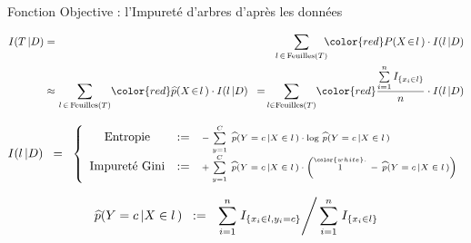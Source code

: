 
\begin{frame}{\vskip -0.5cm \normalsize Fonction Objective : \vskip 0.05cm \Large l'Impuret\'e d'arbres d'apr\`es les donn\'ees}

\vskip -0.5cm

\begin{eqnarray*}
I(T\,\vert D)
& = &
	\!\!\!\!
	\underset{l\,\in\,\textnormal{Feuilles}(T)}{\sum}\!\!
	{\color{red}P(X \!\in\! l\,)} \cdot I(l\,\vert D)
\\
& \approx &
	\!\!\!\!
	\underset{l\,\in\,\textnormal{Feuilles}(T)}{\sum}
	{\color{red}\widehat{p}(X \!\in\! l\,)} \cdot I(l\,\vert D)
\;\; = \;\;
	\!\!\!\!
	\underset{l\in\textnormal{Feuilles}(T)}{\sum}
	{\color{red}\dfrac{\overset{n}{\underset{i=1}{\sum}}\,I_{\{x_{i} \in l\}}}{n}} \cdot I(l\,\vert D)
\end{eqnarray*}

\small
\begin{equation*}
I(l\,\vert D)
\;\; = \;\;
\left\{\begin{array}{ccl}
\textnormal{Entropie}
& := &
	\textnormal{\scriptsize$-\;\overset{C}{\underset{y=1}{\sum}}\;\,
	\widehat{p}(Y=c\,\vert X\in l\,) \cdot \log\,\widehat{p}(Y=c\,\vert X\in l\,)$}
\\
\textnormal{Impuret\'e Gini}
& := &
	\textnormal{\scriptsize$+\;\overset{C}{\underset{y=1}{\sum}}\;\,
	\widehat{p}(Y=c\,\vert X\in l\,) \cdot
	\left(\overset{{\color{white}.}}{1}\,-\,\widehat{p}(Y=c\,\vert X\in l\,)\right)$}
\end{array}\right.
\end{equation*}

\vskip -0.5cm

\footnotesize
\begin{equation*}
\widehat{p}(Y=c\,\vert X\in l\,)
\;\; := \;\;
	\left.\overset{n}{\underset{i=1}{\sum}}\; I_{\{x_{i}\in l, y_{i} = c\}} \right\slash
	\overset{n}{\underset{i=1}{\sum}}\; I_{\{x_{i}\in l\}}
\end{equation*}

\end{frame}
\normalsize

